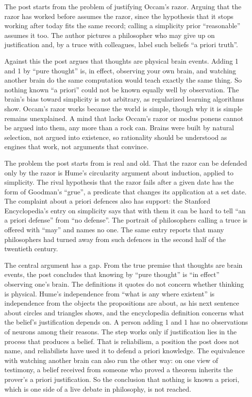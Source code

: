 \begin{afterword}
\summaryhead

The post starts from the problem of justifying Occam's razor. Arguing that the razor has worked before assumes the razor, since the hypothesis that it stops working after today fits the same record; calling a simplicity prior ``reasonable'' assumes it too. The author pictures a philosopher who may give up on justification and, by a truce with colleagues, label such beliefs ``a priori truth''.

Against this the post argues that thoughts are physical brain events. Adding 1 and 1 by ``pure thought'' is, in effect, observing your own brain, and watching another brain do the same computation would teach exactly the same thing. So nothing known ``a priori'' could not be known equally well by observation. The brain's bias toward simplicity is not arbitrary, as regularized learning algorithms show. Occam's razor works because the world is simple, though why it is simple remains unexplained. A mind that lacks Occam's razor or modus ponens cannot be argued into them, any more than a rock can. Brains were built by natural selection, not argued into existence, so rationality should be understood as engines that work, not arguments that convince.

\responsehead

The problem the post starts from is real and old. That the razor can be defended only by the razor is Hume's circularity argument about induction, applied to simplicity. The rival hypothesis that the razor fails after a given date has the form of Goodman's ``grue'', a predicate that changes its application at a set date. The complaint about a priori defences also has support: the Stanford Encyclopedia's entry on simplicity says that with them it can be hard to tell ``an a priori defense'' from ``no defense''. The portrait of philosophers calling a truce is offered with ``may'' and names no one. The same entry reports that many philosophers had turned away from such defences in the second half of the twentieth century.

The central argument has a gap. From the true premise that thoughts are brain events, the post concludes that knowing by ``pure thought'' is ``in effect'' observing one's brain. The definitions it quotes do not concern whether thinking is physical. Hume's independence from ``what is any where existent'' is independence from the objects the propositions are about, as his next sentence about circles and triangles shows, and the encyclopedia definition concerns what the belief's justification depends on. A person adding 1 and 1 has no observations of neurons among their reasons. The step works only if justification lies in the process that produces a belief. That is reliabilism, a position the post does not name, and reliabilists have used it to defend a priori knowledge. The equivalence with watching another brain can also run the other way: on one view of testimony, a belief received from someone who proved a theorem inherits the prover's a priori justification. So the conclusion that nothing is known a priori, which is one side of a live debate in philosophy, is not reached.


\end{afterword}
